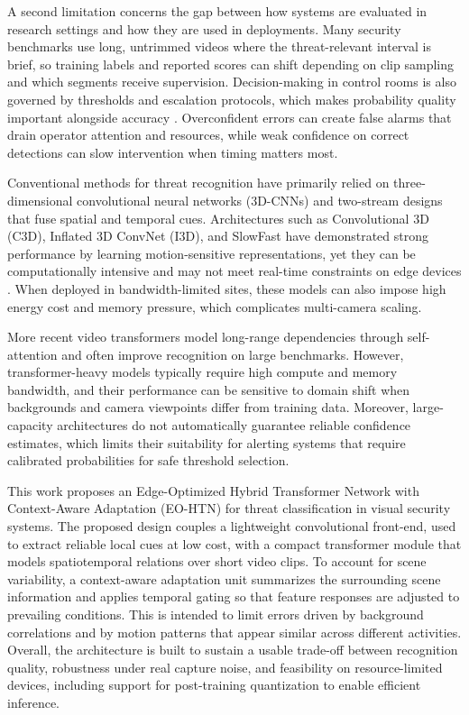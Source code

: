 \documentclass[AMA,Times1COL]{WileyNJDv5} %
\begin{document}
A second limitation concerns the gap between how systems are evaluated in research settings and how they are used in deployments. Many security benchmarks use long, untrimmed videos where the threat-relevant interval is brief, so training labels and reported scores can shift depending on clip sampling and which segments receive supervision. Decision-making in control rooms is also governed by thresholds and escalation protocols, which makes probability quality important alongside accuracy \cite{b4}. Overconfident errors can create false alarms that drain operator attention and resources, while weak confidence on correct detections can slow intervention when timing matters most.

Conventional methods for threat recognition have primarily relied on three-dimensional convolutional neural networks (3D-CNNs) and two-stream designs that fuse spatial and temporal cues. Architectures such as Convolutional 3D (C3D), Inflated 3D ConvNet (I3D), and SlowFast have demonstrated strong performance by learning motion-sensitive representations, yet they can be computationally intensive and may not meet real-time constraints on edge devices \cite{b5}. When deployed in bandwidth-limited sites, these models can also impose high energy cost and memory pressure, which complicates multi-camera scaling.

More recent video transformers model long-range dependencies through self-attention and often improve recognition on large benchmarks. However, transformer-heavy models typically require high compute and memory bandwidth, and their performance can be sensitive to domain shift when backgrounds and camera viewpoints differ from training data. Moreover, large-capacity architectures do not automatically guarantee reliable confidence estimates, which limits their suitability for alerting systems that require calibrated probabilities for safe threshold selection.

This work proposes an Edge-Optimized Hybrid Transformer Network with Context-Aware Adaptation (EO-HTN) for threat classification in visual security systems. The proposed design couples a lightweight convolutional front-end, used to extract reliable local cues at low cost, with a compact transformer module that models spatiotemporal relations over short video clips. To account for scene variability, a context-aware adaptation unit summarizes the surrounding scene information and applies temporal gating so that feature responses are adjusted to prevailing conditions. This is intended to limit errors driven by background correlations and by motion patterns that appear similar across different activities. Overall, the architecture is built to sustain a usable trade-off between recognition quality, robustness under real capture noise, and feasibility on resource-limited devices, including support for post-training quantization to enable efficient inference.
\end{document}
